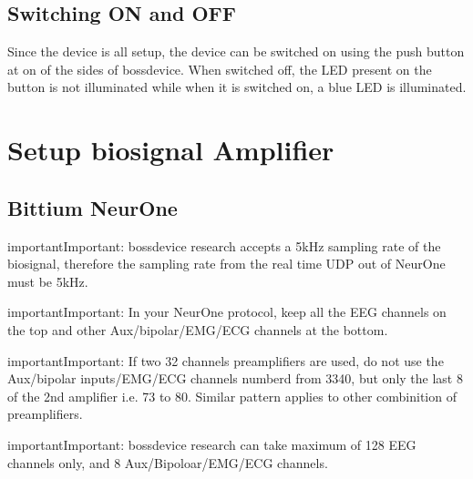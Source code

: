 \documentclass[letterpaper,10pt,english]{sphinxmanual}
\begin{document}
\section{Switching ON and OFF}
\label{\detokenize{2_setup_bossdevice_research:switching-on-and-off}}
\sphinxAtStartPar
Since the device is all setup, the device can be switched on using the push button at on of the sides of bossdevice. When switched off, the LED present on the button is not illuminated while when it is switched on, a blue LED is illuminated.


\chapter{Setup biosignal Amplifier}
\label{\detokenize{3_setup_biosignal_amplifier:setup-biosignal-amplifier}}\label{\detokenize{3_setup_biosignal_amplifier::doc}}

\section{Bittium NeurOne}
\label{\detokenize{3_setup_biosignal_amplifier:bittium-neurone}}
\begin{sphinxadmonition}{important}{Important:}
\sphinxAtStartPar
bossdevice research accepts a 5kHz sampling rate of the biosignal, therefore the sampling rate from the real time UDP out of NeurOne must be 5kHz.
\end{sphinxadmonition}

\begin{sphinxadmonition}{important}{Important:}
\sphinxAtStartPar
In your NeurOne protocol, keep all the EEG channels on the top and other Aux/bipolar/EMG/ECG channels at the bottom.
\end{sphinxadmonition}

\begin{sphinxadmonition}{important}{Important:}
\sphinxAtStartPar
If two 32 channels preamplifiers are used, do not use the Aux/bipolar inputs/EMG/ECG channels numberd from 33\sphinxhyphen{}40, but only the last 8 of the 2nd amplifier i.e. 73 to 80. Similar pattern applies to other combinition of preamplifiers.
\end{sphinxadmonition}

\begin{sphinxadmonition}{important}{Important:}
\sphinxAtStartPar
bossdevice research can take maximum of 128 EEG channels only, and 8 Aux/Bipoloar/EMG/ECG channels.
\end{sphinxadmonition}
\end{document}
